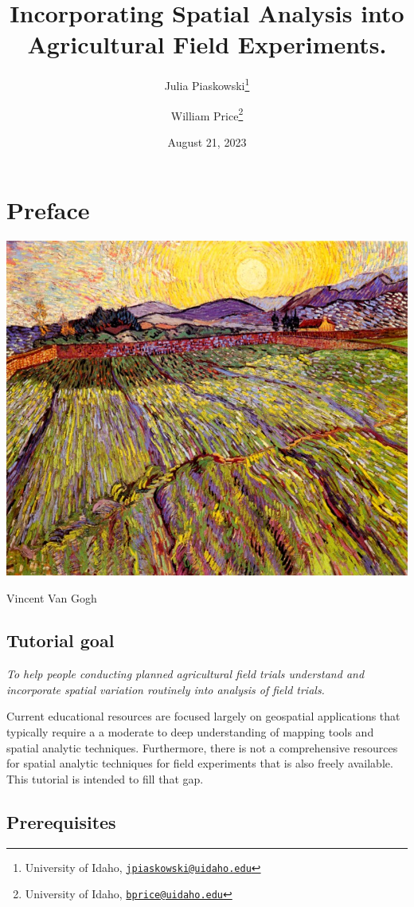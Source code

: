 \documentclass[
]{book}
\title{Incorporating Spatial Analysis into Agricultural Field Experiments.}
\author{Julia Piaskowski\footnote{University of Idaho, \href{mailto:jpiaskowski@uidaho.edu}{\nolinkurl{jpiaskowski@uidaho.edu}}} \and William Price\footnote{University of Idaho, \href{mailto:bprice@uidaho.edu}{\nolinkurl{bprice@uidaho.edu}}}}
\date{August 21, 2023}
\begin{document}
\maketitle

{
\setcounter{tocdepth}{1}
\tableofcontents
}
\hypertarget{preface}{%
\chapter{Preface}\label{preface}}

\begin{center}\includegraphics[width=0.9\linewidth]{img/wheat_field_van_gogh} \end{center}

Vincent Van Gogh

\hypertarget{tutorial-goal}{%
\section{Tutorial goal}\label{tutorial-goal}}

\emph{To help people conducting planned agricultural field trials understand and incorporate spatial variation routinely into analysis of field trials.}

Current educational resources are focused largely on geospatial applications that typically require a a moderate to deep understanding of mapping tools and spatial analytic techniques. Furthermore, there is not a comprehensive resources for spatial analytic techniques for field experiments that is also freely available. This tutorial is intended to fill that gap.

\hypertarget{prerequisites}{%
\section{Prerequisites}\label{prerequisites}}
\end{document}

